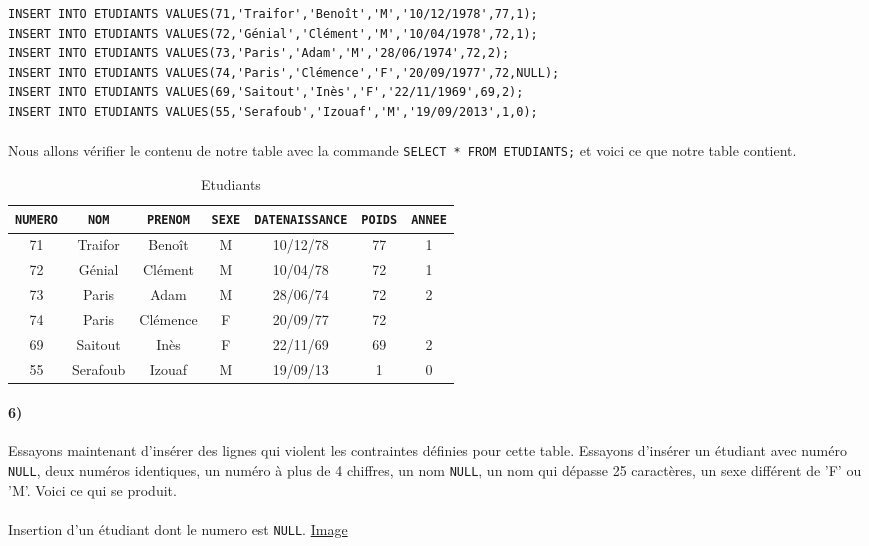 \documentclass{report}
\begin{document}
\begin{lstlisting}
INSERT INTO ETUDIANTS VALUES(71,'Traifor','Benoît','M','10/12/1978',77,1);
INSERT INTO ETUDIANTS VALUES(72,'Génial','Clément','M','10/04/1978',72,1);
INSERT INTO ETUDIANTS VALUES(73,'Paris','Adam','M','28/06/1974',72,2);
INSERT INTO ETUDIANTS VALUES(74,'Paris','Clémence','F','20/09/1977',72,NULL);
INSERT INTO ETUDIANTS VALUES(69,'Saitout','Inès','F','22/11/1969',69,2);
INSERT INTO ETUDIANTS VALUES(55,'Serafoub','Izouaf','M','19/09/2013',1,0);
\end{lstlisting}

\paragraph{}Nous allons vérifier le contenu de notre table avec la commande {\tt SELECT * FROM ETUDIANTS;} et voici ce que notre table contient.

\begin{table}[H]
	\center
	\begin{tabular}{|c|c|c|c|c|c|c|}
		\hline
		\verb+NUMERO+ & \verb+NOM+ & \verb+PRENOM+ & \verb+SEXE+ & \verb+DATENAISSANCE+ & \verb+POIDS+ & \verb+ANNEE+ \\
		\hline
		71 & Traifor & Benoît & M & 10/12/78 & 77 & 1 \\
		\hline
		72 & Génial & Clément & M & 10/04/78 & 72 & 1 \\
		\hline
		73 & Paris & Adam & M & 28/06/74 & 72 & 2 \\
		\hline
		74 & Paris & Clémence & F & 20/09/77 & 72 & \\
		\hline
		69 & Saitout & Inès & F & 22/11/69 & 69 & 2 \\
		\hline
		55 & Serafoub & Izouaf & M & 19/09/13 & 1 & 0 \\
		\hline
	\end{tabular}
	\caption{Etudiants}
\end{table}

\paragraph{6)}Essayons maintenant d'insérer des lignes qui violent les contraintes définies pour cette table. Essayons d'insérer un étudiant avec numéro {\tt NULL}, deux numéros identiques, un numéro à plus de 4 chiffres, un nom {\tt NULL}, un nom qui dépasse 25 caractères, un sexe différent de 'F' ou 'M'.
Voici ce qui se produit.

\paragraph{}Insertion d'un étudiant dont le numero est {\tt NULL}. \href{run:./Images/TP1/contrainte1.png}{Image}
\end{document}
